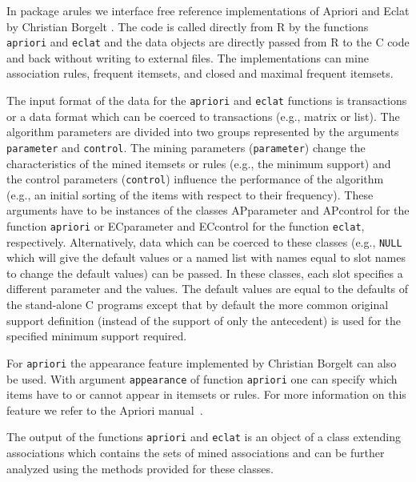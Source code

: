 \documentclass[10pt,a4paper]{article}
\newcommand{\strong}[1]{{\normalfont\fontseries{b}\selectfont #1}}
\newcommand{\class}[1]{\textsf{#1}}
\newcommand{\code}[1]{\texttt{#1}}
\newcommand{\pkg}[1]{\strong{#1}}
\newcommand{\proglang}[1]{\textsf{#1}}
\begin{document}
In package \pkg{arules} we interface free reference implementations of
Apriori and Eclat by Christian Borgelt
\citep{arules:Borgelt+Kruse:2002,arules:Borgelt:2003}.  The code is
called directly from \proglang{R} by the functions \code{apriori} and
\code{eclat} and the data objects are directly passed from \proglang{R} to
the \proglang{C} code and back without writing to external files.
The implementations can mine association rules, frequent itemsets,
and closed and maximal frequent itemsets. 



The input format of the data for the \code{apriori} and
\code{eclat} functions is
\class{transactions} or a data format which can be coerced to
\class{transactions} (e.g., \class{matrix} or \class{list}).
The algorithm parameters are divided into two groups represented
by the arguments \code{parameter} and \code{control}.
The mining parameters (\code{parameter}) change the
characteristics of the mined itemsets or rules  (e.g., the
minimum support) and the control parameters (\code{control})
influence the
performance of the algorithm (e.g., an initial sorting of the items
with respect to their frequency).
These arguments have to be instances of the
classes \class{APparameter} and \class{APcontrol} for
the function \code{apriori}
or \class{ECparameter} and \class{ECcontrol} for
the function \code{eclat}, respectively.  Alternatively, data which can be coerced to
these classes (e.g., \code{NULL}
which will give the default values or a named list
with names equal to slot names to change the default values) can be passed.
In these classes, each slot specifies a different parameter and the values.  The
default values are equal to the defaults of the stand-alone \proglang{C}
programs \citep{arules:Borgelt:2004} except that by
default the more common original
support definition (instead of the
support of only the antecedent)
is used for the specified minimum support required.

For \code{apriori} the appearance feature implemented by Christian
Borgelt can also be used.  With argument \code{appearance} of function
\code{apriori} one can specify which items have to or cannot appear in
itemsets or rules.  For more information on this feature we refer to the
Apriori manual~\citep{arules:Borgelt:2004}.

The output of the functions \code{apriori} and \code{eclat} is an object
of a class extending \class{associations} which contains the sets of mined
associations and can be further analyzed using the methods provided for
these classes.
\end{document}

